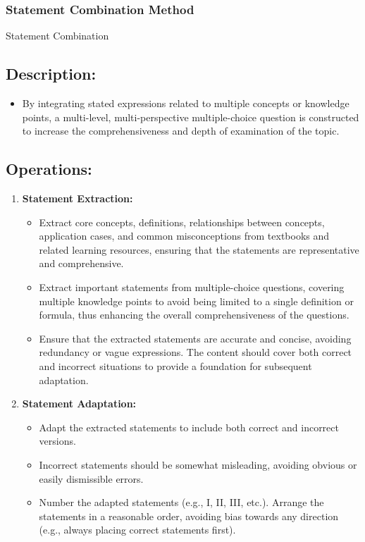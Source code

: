 \subsubsection{Statement Combination Method}
\begin{methodbox}{Statement Combination}
\subsection*{Description:}
\begin{itemize}
    \item By integrating stated expressions related to multiple concepts or knowledge points, a multi-level, multi-perspective multiple-choice question is constructed to increase the comprehensiveness and depth of examination of the topic.
\end{itemize}
\subsection*{Operations:}
\begin{enumerate}
    \item \textbf{Statement Extraction:}
    \begin{itemize}
        \item Extract core concepts, definitions, relationships between concepts, application cases, and common misconceptions from textbooks and related learning resources, ensuring that the statements are representative and comprehensive.
        \item Extract important statements from multiple-choice questions, covering multiple knowledge points to avoid being limited to a single definition or formula, thus enhancing the overall comprehensiveness of the questions.
        \item Ensure that the extracted statements are accurate and concise, avoiding redundancy or vague expressions. The content should cover both correct and incorrect situations to provide a foundation for subsequent adaptation.
    \end{itemize}
    \item \textbf{Statement Adaptation:}
    \begin{itemize}
        \item Adapt the extracted statements to include both correct and incorrect versions.
        \item Incorrect statements should be somewhat misleading, avoiding obvious or easily dismissible errors.
        \item Number the adapted statements (e.g., I, II, III, etc.). Arrange the statements in a reasonable order, avoiding bias towards any direction (e.g., always placing correct statements first).

\end{itemize}
\end{enumerate}
\end{methodbox}
